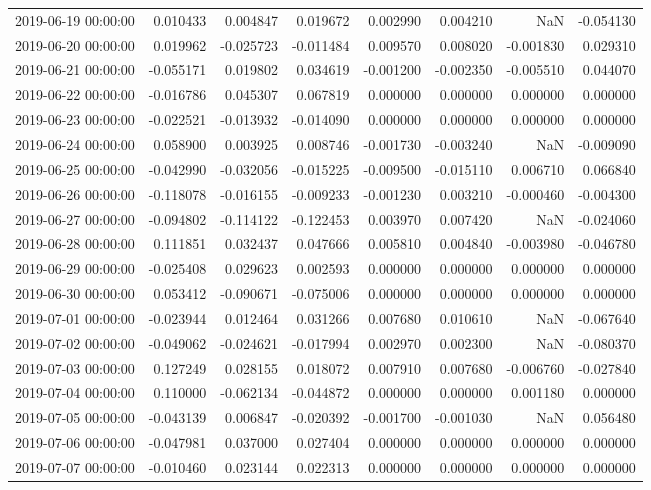 \begin{tabular}{lrrrrrrr}
2019-06-19 00:00:00 & 0.010433 & 0.004847 & 0.019672 & 0.002990 & 0.004210 & NaN & -0.054130 \\
2019-06-20 00:00:00 & 0.019962 & -0.025723 & -0.011484 & 0.009570 & 0.008020 & -0.001830 & 0.029310 \\
2019-06-21 00:00:00 & -0.055171 & 0.019802 & 0.034619 & -0.001200 & -0.002350 & -0.005510 & 0.044070 \\
2019-06-22 00:00:00 & -0.016786 & 0.045307 & 0.067819 & 0.000000 & 0.000000 & 0.000000 & 0.000000 \\
2019-06-23 00:00:00 & -0.022521 & -0.013932 & -0.014090 & 0.000000 & 0.000000 & 0.000000 & 0.000000 \\
2019-06-24 00:00:00 & 0.058900 & 0.003925 & 0.008746 & -0.001730 & -0.003240 & NaN & -0.009090 \\
2019-06-25 00:00:00 & -0.042990 & -0.032056 & -0.015225 & -0.009500 & -0.015110 & 0.006710 & 0.066840 \\
2019-06-26 00:00:00 & -0.118078 & -0.016155 & -0.009233 & -0.001230 & 0.003210 & -0.000460 & -0.004300 \\
2019-06-27 00:00:00 & -0.094802 & -0.114122 & -0.122453 & 0.003970 & 0.007420 & NaN & -0.024060 \\
2019-06-28 00:00:00 & 0.111851 & 0.032437 & 0.047666 & 0.005810 & 0.004840 & -0.003980 & -0.046780 \\
2019-06-29 00:00:00 & -0.025408 & 0.029623 & 0.002593 & 0.000000 & 0.000000 & 0.000000 & 0.000000 \\
2019-06-30 00:00:00 & 0.053412 & -0.090671 & -0.075006 & 0.000000 & 0.000000 & 0.000000 & 0.000000 \\
2019-07-01 00:00:00 & -0.023944 & 0.012464 & 0.031266 & 0.007680 & 0.010610 & NaN & -0.067640 \\
2019-07-02 00:00:00 & -0.049062 & -0.024621 & -0.017994 & 0.002970 & 0.002300 & NaN & -0.080370 \\
2019-07-03 00:00:00 & 0.127249 & 0.028155 & 0.018072 & 0.007910 & 0.007680 & -0.006760 & -0.027840 \\
2019-07-04 00:00:00 & 0.110000 & -0.062134 & -0.044872 & 0.000000 & 0.000000 & 0.001180 & 0.000000 \\
2019-07-05 00:00:00 & -0.043139 & 0.006847 & -0.020392 & -0.001700 & -0.001030 & NaN & 0.056480 \\
2019-07-06 00:00:00 & -0.047981 & 0.037000 & 0.027404 & 0.000000 & 0.000000 & 0.000000 & 0.000000 \\
2019-07-07 00:00:00 & -0.010460 & 0.023144 & 0.022313 & 0.000000 & 0.000000 & 0.000000 & 0.000000 \\

\end{tabular}
